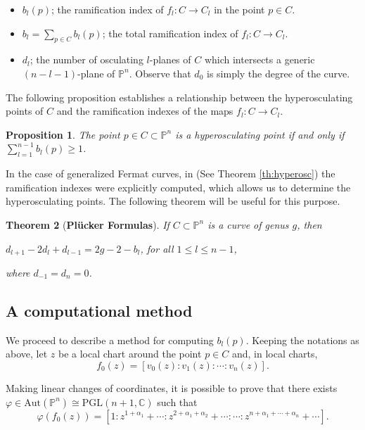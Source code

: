 \documentclass{amsart}
\newcommand{\PGL}[2]{\ensuremath{\mathrm{PGL}(#1, #2)}}
\newtheorem{theorem}{Theorem}
\newtheorem{proposition}[theorem]{Proposition}
\begin{document}
\begin{itemize}
\item  $b_l(p)$;  the ramification index of $f_l:C\rightarrow C_l$ in the point  $p\in C$.
\item  $b_l=\sum_{p\in C}b_l(p)$; the total ramification index of $f_l:C\rightarrow C_l$.
\item  $d_l$; the number  of osculating $l$-planes of $C$ which intersects a generic $(n-l-1)$-plane of ${\mathbb{P}}^{n}$. Observe that $d_0$ is simply the degree of the curve.
\end{itemize}
   
The following proposition establishes a relationship between the hyperosculating points of $C$ and the ramification indexes of the maps $f_l:C\rightarrow C_l$.
 
\begin{proposition}
The point $p\in C\subset {\mathbb{P}}^n$ is a hyperosculating point if and only if $\sum_{l=1}^{n-1}b_l(p)\geq 1$. 
\end{proposition}
 
In the case of generalized Fermat curves, in \cite{HKLP16} (See Theorem \ref{th:hyperosc}) the ramification indexes were explicitly computed, which allows us to determine the hyperosculating points.  The following theorem will be useful for this purpose.
 

 
\begin{theorem}[\bf Pl\"ucker Formulas]
\label{th:plucker}
If $C\subset {\mathbb{P}}^n$ is  a curve of genus  $g$, then 
\begin{center}
$d_{l+1}-2d_l+d_{l-1}=2g-2-b_l$, for all $1\leq l\leq n-1$,
\end{center}
where $d_{-1}=d_n=0$.
\end{theorem}
 
 
\subsection{A computational method}
We proceed to describe a method for computing $b_{l}(p)$.
Keeping the notations as above, let $z$ be a local chart around the point $p\in C$ and, in local charts,
$$f_0(z)=[v_0(z):v_1(z):\cdots:v_n(z)].$$

Making linear changes of coordinates, it is possible to prove that there exists $\varphi\in {\mathrm{Aut}}({\mathbb{P}}^n)\cong \PGL{n+1}{{\mathbb{C}}}$ 
such that
$$
\varphi(f_0(z))=[1: z^{1+\alpha_1}+\cdots: z^{2+\alpha_1+\alpha_2}+\cdots:\cdots :z^{n+\alpha_1+\cdots+\alpha_n}+\cdots].
$$
\end{document}
